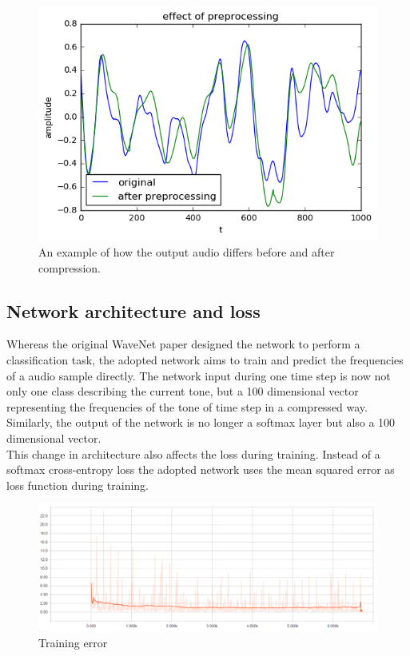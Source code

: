 \documentclass[10pt,conference,compsocconf]{IEEEtran}
\begin{document}
\begin{figure}[tbp]
  \centering
  \includegraphics[width=\columnwidth]{figures/preprocessing_difference_waveform}
  \caption{An example of how the output audio differs before and after compression.}
  \label{fig:preprocessing_difference_waveform}
\end{figure}

\subsection{Network architecture and loss}
Whereas the original WaveNet paper designed the network to perform a classification task, the adopted network aims to train and predict the frequencies of a audio sample directly. The network input during one time step is now not only one class describing the current tone, but a 100 dimensional vector representing the frequencies of the tone of time step in a compressed way. Similarly, the output of the network is no longer a softmax layer but also a 100 dimensional vector.\\
This change in architecture also affects the loss during training. Instead of a softmax cross-entropy loss the adopted network uses the mean squared error as loss function during training.

\begin{figure}[tbp]
  \centering
  \includegraphics[width=\columnwidth]{figures/loss.png}
  \caption{Training error}
  \label{fig:training_error}
\end{figure}
\end{document}
